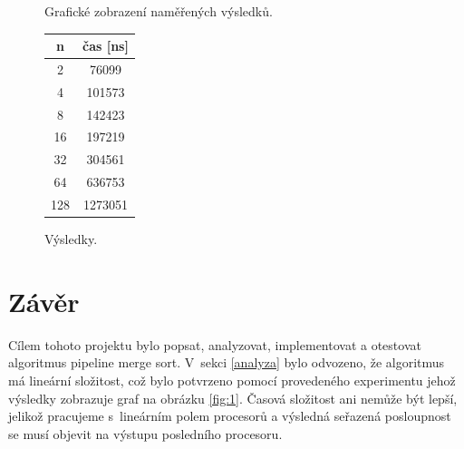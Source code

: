 \documentclass[10pt,a4paper,notitlepage]{article}
\begin{document}
\begin{figure}[h]
\centering
\begin{minipage}[t]{.4\textwidth}
\centering
\vspace{0pt}
  
\caption{Grafické zobrazení naměřených výsledků.}
\label{fig:1}
\end{minipage}\hfill
\begin{minipage}[t]{.4\textwidth}
\centering
\vspace{0pt}

\caption{Výsledky.}
  \begin{tabular}{|c|c|}
    \hline
  \textbf{n} & \textbf{čas [ns]} \\ \hline
    2 &   76099\\ \hline
    4  &  101573\\ \hline
    8   & 142423\\ \hline
    16 &  197219\\ \hline
    32 &  304561\\ \hline
    64 &  636753\\ \hline
    128 & 1273051\\ \hline
  \end{tabular}
\label{exp:res}
\end{minipage}
\end{figure}

\section{Závěr}
Cílem tohoto projektu bylo popsat, analyzovat, implementovat a otestovat
algoritmus pipeline merge sort. V~sekci \ref{analyza} bylo odvozeno, že
algoritmus má lineární složitost, což bylo potvrzeno pomocí provedeného
experimentu jehož výsledky zobrazuje graf na obrázku \ref{fig:1}.
Časová složitost ani nemůže být lepší, jelikož pracujeme s~lineárním polem
procesorů a výsledná seřazená posloupnost se musí objevit na výstupu posledního
procesoru.
\end{document}
